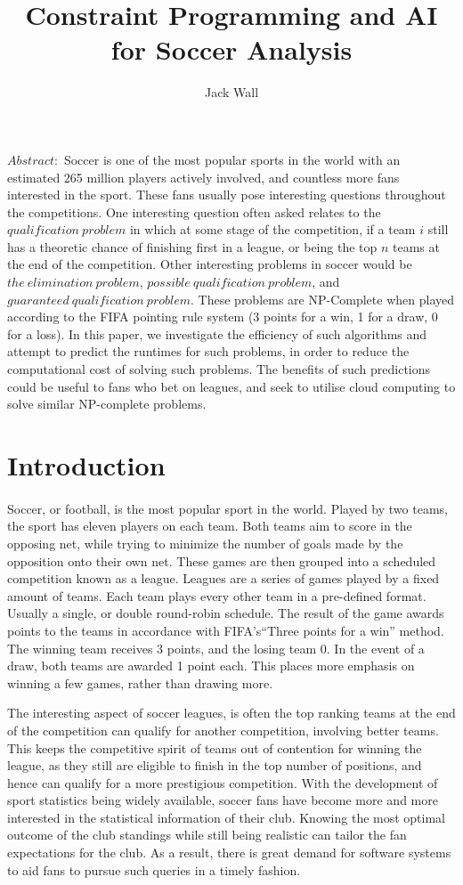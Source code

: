 \documentclass{article}
\title{Constraint Programming and AI for Soccer Analysis}
\author{Jack Wall}
\begin{document}
	
	\maketitle
	\(Abstract:\) Soccer is one of the most popular sports in the world with an estimated 265 million players actively involved, and countless more fans interested in the sport. These fans usually pose interesting questions throughout the competitions. One interesting question often asked relates to the \(qualification\ problem\) in which at some stage of the competition, if a team \(i\) still has a theoretic chance of finishing first in a league, or being the top \(n\) teams at the end of the competition. Other interesting problems in soccer would be \(the\ elimination\ problem\), \(possible\ qualification\ problem\), and \(guaranteed\ qualification\ problem\). These problems are NP-Complete when played according to the FIFA pointing rule system (3 points for a win, 1 for a draw, 0 for a loss). In this paper, we investigate the efficiency of such algorithms and attempt to predict the runtimes for such problems, in order to reduce the computational cost of solving such problems. The benefits of such predictions could be useful to fans who bet on leagues, and seek to utilise cloud computing to solve similar NP-complete problems. 
	
	\section{Introduction}
	\paragraph{}
	Soccer, or football, is the most popular sport in the world. Played by two teams, the sport has eleven players on each team. Both teams aim to score in the opposing net, while trying to minimize the number of goals made by the opposition onto their own net. These games are then grouped into a scheduled competition known as a league. Leagues are a series of games played by a fixed amount of teams.
	Each team plays every other team in a pre-defined format. Usually a single, or double round-robin schedule. The result of the game awards points to the teams in accordance with FIFA’s``Three points for a win'' method. The winning team receives 3 points, and the losing team 0. In the event of a draw, both teams are awarded 1 point each. This places more emphasis on winning a few games, rather than drawing more.


	The interesting aspect of soccer leagues, is often the top ranking teams at the end of the competition can qualify for another competition, involving better teams. This keeps the competitive spirit of teams out of contention for winning the league, as they still are eligible to finish in the top number of positions, and hence can qualify for a more prestigious competition.
	With the development of sport statistics being widely available, soccer fans have become more and more interested in the statistical information of their club. Knowing the most optimal outcome of the club standings while still being realistic can tailor the fan expectations for the club. As a result, there is great demand for software systems to aid fans to pursue such queries in a timely fashion.
	
\end{document}
